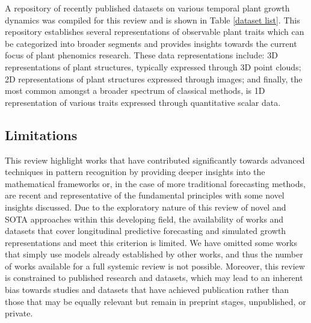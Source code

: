 \documentclass{article}
\begin{document}
A repository of recently published datasets on various temporal plant growth dynamics was compiled for this review and is shown in Table \ref{dataset list}. This repository establishes several representations of observable plant traits which can be categorized into broader segments and provides insights towards the current focus of plant phenomics research. These data representations include: 3D representations of plant structures, typically expressed through 3D point clouds; 2D representations of plant structures expressed through images; and finally, the most common amongst a broader spectrum of classical methods, is 1D representation of various traits expressed through quantitative scalar data. 

\subsection{Limitations}
This review highlight works that have contributed significantly towards advanced techniques in pattern recognition by providing deeper insights into the mathematical frameworks or, in the case of more traditional forecasting methods, are recent and representative of the fundamental principles with some novel insights discussed.
Due to the exploratory nature of this review of novel and SOTA approaches within this developing field, the availability of works and datasets that cover longitudinal predictive forecasting and simulated growth representations and meet this criterion is limited. 
We have omitted some works that simply use models already established by other works, and thus the number of works available for a full systemic review is not possible. 
Moreover, this review is constrained to published research and datasets, which may lead to an inherent bias towards studies and datasets that have achieved publication rather than those that may be equally relevant but remain in preprint stages, unpublished, or private.
\end{document}
